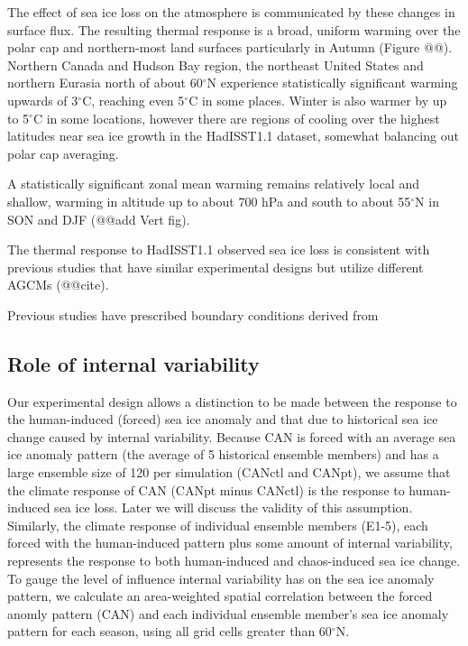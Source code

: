 \documentclass[twocol]{ametsoc}
\begin{document}
The effect of sea ice loss on the atmosphere is communicated by these changes in surface flux. The resulting thermal response is a broad, uniform warming over the polar cap and northern-most land surfaces particularly in Autumn (Figure @@). Northern Canada and Hudson Bay region, the northeast United States and northern Eurasia north of about 60$^\circ$N experience statistically significant warming upwards of 3$^\circ$C, reaching even 5$^\circ$C in some places. Winter is also warmer by up to 5$^\circ$C in some locations, however there are regions of cooling over the highest latitudes near sea ice growth in the HadISST1.1 dataset, somewhat balancing out polar cap averaging.

 A statistically significant zonal mean warming remains relatively local and shallow, warming in altitude up to about 700 hPa and south to about 55$^\circ$N in SON and DJF (@@add Vert fig).

The thermal response to HadISST1.1 observed sea ice loss is consistent with previous studies that have similar experimental designs but utilize different AGCMs (@@cite).

Previous studies have prescribed boundary conditions derived from


\subsection{Role of internal variability}
Our experimental design allows a distinction to be made between the response to the human-induced (forced) sea ice anomaly and that due to historical sea ice change caused by internal variability. Because CAN is forced with an average sea ice anomaly pattern (the average of 5 historical ensemble members) and has a large ensemble size of 120 per simulation (CANctl and CANpt), we assume that the climate response of CAN (CANpt minus CANctl) is the response to human-induced sea ice loss. Later we will discuss the validity of this assumption. Similarly, the climate response of individual ensemble members (E1-5), each forced with the human-induced pattern plus some amount of internal variability, represents the response to both human-induced and chaos-induced sea ice change. To gauge the level of influence internal variability has on the sea ice anomaly pattern, we calculate an area-weighted spatial correlation between the forced anomly pattern (CAN) and each individual ensemble member's sea ice anomaly pattern for each season, using all grid cells greater than 60$^\circ$N. 
\end{document}
